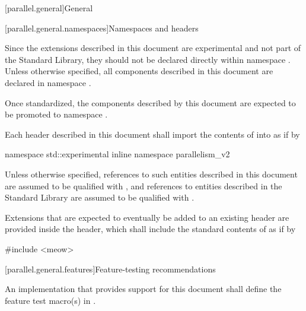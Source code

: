 
[parallel.general]{General}

[parallel.general.namespaces]{Namespaces and headers}

\pnum Since the extensions described in this document are
experimental and not part of the \Cpp Standard Library, they should not be
declared directly within namespace . Unless otherwise specified, all
components described in this document are declared in namespace
.

\begin{note}Once standardized, the components described by this document
are expected to be promoted to namespace .\end{note}

\pnum
Each header described in this document shall import the contents of  into  as if by
\begin{codeblock}
namespace std::experimental {
  inline namespace parallelism_v2 {}
}
\end{codeblock}

\pnum Unless otherwise specified, references to such entities described in this
document are assumed to be qualified with
, and references to entities described
in the \Cpp Standard Library are assumed to be qualified with .

\pnum Extensions that are expected to eventually be added to an existing header  are provided inside the  header, which shall include the standard contents of  as if by

\begin{codeblock}
#include <meow>
\end{codeblock}

[parallel.general.features]{Feature-testing recommendations}

\pnum An implementation that provides support for this document shall define the feature test macro(s) in .

